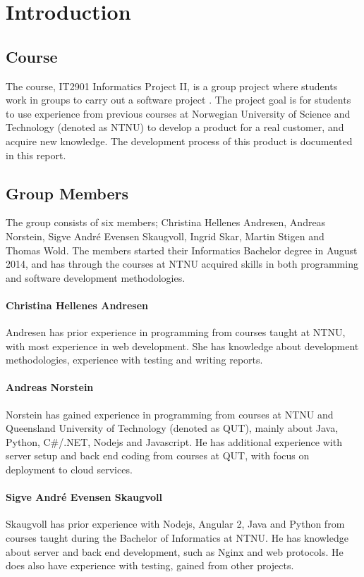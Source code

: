 
\chapter{Introduction}

\section{Course}
The course, IT2901 Informatics Project II, is a group project where students work in groups to carry out a software project \cite{EmneKode}. The project goal is for students to use experience from previous courses at Norwegian University of Science and Technology (denoted as NTNU) to develop a product for a real customer, and acquire new knowledge. The development process of this product is documented in this report.


\section{Group Members}
The group consists of six members; Christina Hellenes Andresen, Andreas Norstein, Sigve André Evensen Skaugvoll, Ingrid Skar, Martin Stigen and Thomas Wold. The members started their Informatics Bachelor degree in August 2014, and has through the courses at NTNU acquired skills in both programming and software development methodologies.

\subsubsection{Christina Hellenes Andresen}
\label{christina}
Andresen has prior experience in programming from courses taught at NTNU, with most experience in web development. She has knowledge about development methodologies, experience with testing and writing reports.

\subsubsection{Andreas Norstein}
\label{andreas}
Norstein has gained experience in programming from courses at NTNU and Queensland University of Technology (denoted as QUT), mainly about Java, Python, C\#/.NET, Nodejs and Javascript. He has additional experience with server setup and back end coding from courses at QUT, with focus on deployment to cloud services. 

\subsubsection{Sigve André Evensen Skaugvoll}
\label{sigve}
Skaugvoll has prior experience with Nodejs, Angular 2, Java and Python from courses taught during the Bachelor of Informatics at NTNU. He has knowledge about server and back end development, such as Nginx and web protocols. He does also have experience with testing, gained from other projects.

